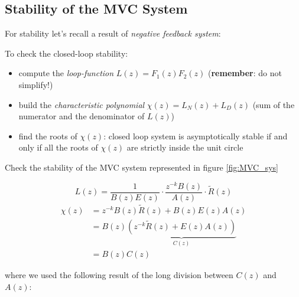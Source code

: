 \subsection{Stability of the MVC System}\label{subsec:MVC_stability}

\begin{rem}
    For stability let's recall a result of \emph{negative feedback system}:
    \begin{figure}[H]
        \centering
    \end{figure}

    To check the closed-loop stability:
    \begin{itemize}
        \item compute the \emph{loop-function} $L(z) = F_1(z) F_2(z)$ (\textbf{remember}: do not simplify!)
        \item build the \emph{characteristic polynomial} $\chi(z) = L_N(z) + L_D(z)$ (sum of the numerator and the denominator of $L(z)$)
        \item find the roots of $\chi(z)$: closed loop system is asymptotically stable if and only if all the roots of $\chi(z)$ are strictly inside the unit circle
    \end{itemize}
\end{rem}

Check the stability of the MVC system represented in figure \ref{fig:MVC_sys}

\[
    L(z) = \frac{1}{B(z)E(z)}\cdot \frac{z^{-k}B(z)}{A(z)}\cdot\tilde{R}(z)
\]
\begin{align*}
    \chi(z) &= z^{-k}B(z)\tilde{R}(z) + B(z)E(z)A(z) \\
    &= B(z) \underbrace{\left( z^{-k}\tilde{R}(z)+E(z)A(z) \right)}_{C(z)}  \\
    &= B(z)C(z)
\end{align*}

where we used the following result of the long division between $C(z)$ and $A(z)$:

